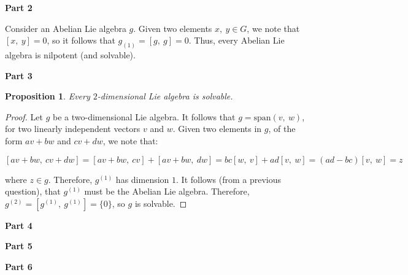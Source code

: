 \documentclass[10pt, oneside]{article}
\newtheorem{prop}{Proposition}
\begin{document}
    \textbf{Part 2}
    \newline

    Consider an Abelian Lie algebra $g$. Given two elements $x, \ y \in G$, we note that $[x, \ y] = 0$, so it follows that $g_{(1)} = [g, \ g] = 0$.
    Thus, every Abelian Lie algebra is nilpotent (and solvable).
    \newline

    \textbf{Part 3}
    \newline

    \begin{prop}
      Every $2$-dimensional Lie algebra is solvable.
    \end{prop}

    \begin{proof}
      Let $g$ be a two-dimensional Lie algebra. It follows that $g = \text{span}(v, \ w)$, for two linearly independent vectors $v$ and $w$.
      Given two elements in $g$, of the form $av + bw$ and $cv + dw$, we note that:

      $$[av + bw, \ cv + dw] = [av + bw, \ cv] + [av + bw, \ dw] = bc[w, \ v] + ad[v, \ w] = (ad - bc)[v, \ w] = z$$

      where $z \in g$. Therefore, $g^{(1)}$ has dimension $1$. It follows (from a previous question), that $g^{(1)}$ must be the Abelian Lie algebra. Therefore,
      $g^{(2)} = [g^{(1)}, \ g^{(1)}] = \{0\}$, so $g$ is solvable.
    \end{proof}

    \textbf{Part 4}
    \newline

    \textbf{Part 5}
    \newline

    \textbf{Part 6}
    \newline

    
\end{document}
